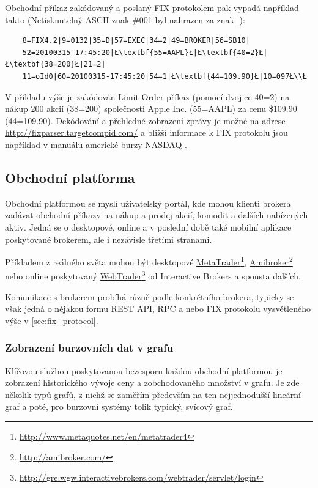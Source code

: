 \documentclass[thesis=M,czech]{FITthesis}[2012/06/26]
\newcommand\fnurl[2]{\href{#2}{#1}\footnote{\url{#2}}}
\begin{document}
	Obchodní příkaz zakódovaný a poslaný FIX protokolem pak vypadá například takto (Netisknutelný ASCII znak \#001 byl nahrazen za znak |):

\begin{lstlisting}
	8=FIX4.2|9=0132|35=D|57=EXEC|34=2|49=BROKER|56=SB10|
	52=20100315-17:45:20|Ł\textbf{55=AAPL}Ł|Ł\textbf{40=2}Ł|Ł\textbf{38=200}Ł|21=2|
	11=oId0|60=20100315-17:45:20|54=1|Ł\textbf{44=109.90}Ł|10=097Ł\\Ł
\end{lstlisting}

	V příkladu výše je zakódován Limit Order příkaz (pomocí dvojice 40=2) na nákup 200 akcií (38=200) společnosti Apple Inc. (55=AAPL) za cenu \$109.90 (44=109.90). Dekódování a přehledné zobrazení zprávy je možné na adrese \url{http://fixparser.targetcompid.com/} a bližší informace k FIX protokolu jsou například v manuálu americké burzy NASDAQ \cite{FIXManual}.
	

\subsection{Obchodní platforma}
	
	Obchodní platformou se myslí uživatelský portál, kde mohou klienti brokera zadávat obchodní příkazy na nákup a prodej akcií, komodit a dalších nabízených aktiv. Jedná se o desktopové, online a v poslední době také mobilní aplikace poskytované brokerem, ale i nezávisle třetími stranami.

	Příkladem z reálného světa mohou být desktopové \fnurl{MetaTrader}{http://www.metaquotes.net/en/metatrader4}, \fnurl{Amibroker}{http://amibroker.com/} nebo online poskytovaný \fnurl{WebTrader}{http://gre.wgw.interactivebrokers.com/webtrader/servlet/login} od Interactive Brokers a spousta dalších. 

	Komunikace s brokerem probíhá různě podle konkrétního brokera, typicky se však jedná o nějakou formu REST API, RPC a nebo FIX protokolu vysvětleného výše v \ref{sec:fix_protocol}.

\subsubsection{Zobrazení burzovních dat v grafu}
\label{sec:stock_charts}

	Klíčovou službou poskytovanou bezesporu každou obchodní platformou je zobrazení historického vývoje ceny a zobchodovaného množství v grafu. Je zde několik typů grafů, z nichž se zaměřím především na ten nejjednodušší lineární graf a poté, pro burzovní systémy tolik typický, svícový graf.
	
\end{document}
